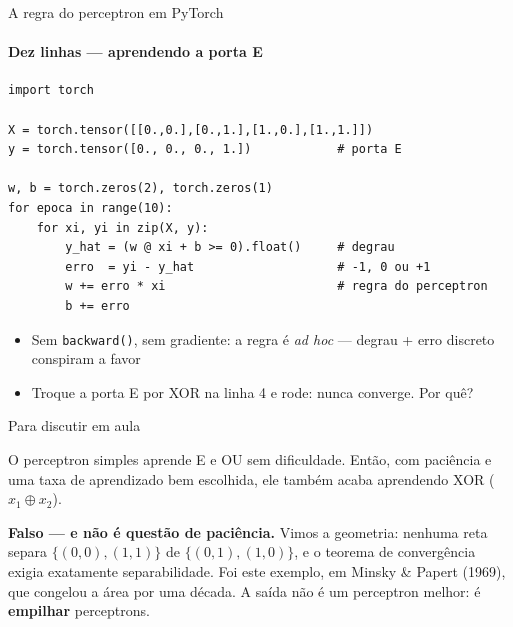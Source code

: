 \documentclass[aspectratio=169, 11pt]{beamer}
\begin{document}
\begin{frame}[fragile]{A regra do perceptron em PyTorch}
  \framesubtitle{Dez linhas — aprendendo a porta E}

\begin{lstlisting}
import torch

X = torch.tensor([[0.,0.],[0.,1.],[1.,0.],[1.,1.]])
y = torch.tensor([0., 0., 0., 1.])            # porta E

w, b = torch.zeros(2), torch.zeros(1)
for epoca in range(10):
    for xi, yi in zip(X, y):
        y_hat = (w @ xi + b >= 0).float()     # degrau
        erro  = yi - y_hat                    # -1, 0 ou +1
        w += erro * xi                        # regra do perceptron
        b += erro
\end{lstlisting}

  \begin{itemize}\setlength{\itemsep}{0.2ex}
    \item Sem \texttt{backward()}, sem gradiente: a regra é \emph{ad hoc} —
          degrau + erro discreto conspiram a favor
    \item Troque a porta E por XOR na linha 4 e rode: \alert{nunca converge}.
          Por quê?
  \end{itemize}
\end{frame}

\begin{frame}{Para discutir em aula}
  \begin{quizbox}
    O perceptron simples aprende E e OU sem dificuldade. Então, com paciência e
    uma taxa de aprendizado bem escolhida, ele também acaba aprendendo XOR
    ($x_1 \oplus x_2$).

    \smallskip
  \end{quizbox}

  \pause

  \begin{respbox}
    \textbf{Falso — e não é questão de paciência.} Vimos a geometria:
    \alert{nenhuma reta} separa $\{(0,0),(1,1)\}$ de $\{(0,1),(1,0)\}$, e o
    teorema de convergência exigia exatamente separabilidade. Foi este
    exemplo, em Minsky \& Papert (1969), que congelou a área por uma década.
    A saída não é um perceptron melhor: é \textbf{empilhar} perceptrons.
  \end{respbox}
\end{frame}
\end{document}
